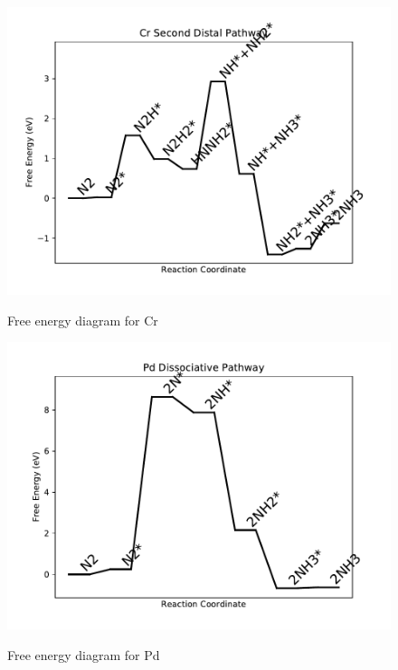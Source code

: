 \documentclass{article}
\begin{document}
\newpage
\begin{figure}
\includegraphics[width=1\linewidth]{data/plots/Cr_distal_2.pdf}
\label{fig:Cr_distal_2}
\caption{Free energy diagram for Cr}
\end{figure}

\begin{figure}
\includegraphics[width=1\linewidth]{data/plots/Pd_dissociative.pdf}
\label{fig:Pd_dissociative}
\caption{Free energy diagram for Pd}
\end{figure}
\end{document}
